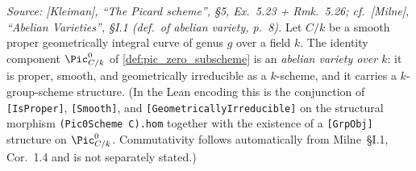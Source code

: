 \begin{theorem}
  \label{thm:pic_zero_is_abelian_variety}

  \textit{Source: [Kleiman], ``The Picard scheme'', \S 5,
  Ex.~5.23 + Rmk.~5.26; cf.\ [Milne], ``Abelian Varieties'',
  \S I.1 (def.\ of abelian variety, p.~8).}
  Let \(C/k\) be a smooth proper geometrically integral curve of genus
  \(g\) over a field \(k\). The identity component \(\Pic^0_{C/k}\) of
  \cref{def:pic_zero_subscheme} is an \emph{abelian variety over
  \(k\)}: it is proper, smooth, and geometrically irreducible as a
  \(k\)-scheme, and it carries a \(k\)-group-scheme structure. (In the
  Lean encoding this is the conjunction of
  \texttt{[IsProper]}, \texttt{[Smooth]}, and
  \texttt{[GeometricallyIrreducible]} on the structural morphism
  \texttt{(Pic0Scheme C).hom} together with the existence of a
  \texttt{[GrpObj]} structure on \(\Pic^0_{C/k}\). Commutativity
  follows automatically from Milne~\S I.1, Cor.~1.4 and is not
  separately stated.)
\end{theorem}

